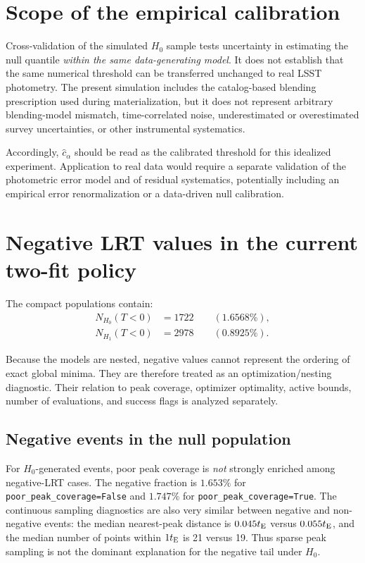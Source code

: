 \documentclass[11pt,a4paper]{article}
\newcommand{\te}{t_{\rm E}}
\newcommand{\Hnull}{H_0}
\newcommand{\Halt}{H_1}
\begin{document}
\section{Scope of the empirical calibration}

Cross-validation of the simulated $\Hnull$ sample tests uncertainty in estimating the null
quantile \emph{within the same data-generating model}.  It does not establish that the same
numerical threshold can be transferred unchanged to real LSST photometry.  The present
simulation includes the catalog-based blending prescription used during materialization, but it
does not represent arbitrary blending-model mismatch, time-correlated noise, underestimated or
overestimated survey uncertainties, or other instrumental systematics.

Accordingly, $\widehat c_\alpha$ should be read as the calibrated threshold for this idealized
experiment.  Application to real data would require a separate validation of the photometric
error model and of residual systematics, potentially including an empirical error
renormalization or a data-driven null calibration.
\section{Negative LRT values in the current two-fit policy}

The compact populations contain:
\begin{align}
    N_{\Hnull}(T<0) &= 1722
    \qquad (1.6568\%),\\
    N_{\Halt}(T<0) &= 2978
    \qquad (0.8925\%).
\end{align}

Because the models are nested, negative values cannot represent the ordering of exact global
minima. They are therefore treated as an optimization/nesting diagnostic. Their relation to
peak coverage, optimizer optimality, active bounds, number of evaluations, and success flags
is analyzed separately.

\subsection{Negative events in the null population}

For $\Hnull$-generated events, poor peak coverage is \emph{not} strongly enriched among
negative-LRT cases. The negative fraction is $1.653\%$ for
\texttt{poor\_peak\_coverage=False} and $1.747\%$ for
\texttt{poor\_peak\_coverage=True}. The continuous sampling diagnostics are also very similar
between negative and non-negative events: the median nearest-peak distance is $0.045\te$ versus
$0.055\te$, and the median number of points within $1\te$ is 21 versus 19. Thus sparse peak
sampling is not the dominant explanation for the negative tail under $\Hnull$.
\end{document}
